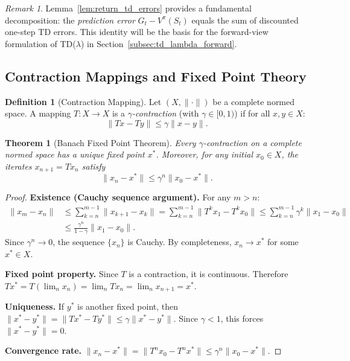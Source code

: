 \documentclass[11pt,a4paper]{article}
\theoremstyle{definition}
\newtheorem{definition}{Definition}[section]
\theoremstyle{plain}
\newtheorem{theorem}{Theorem}[section]
\theoremstyle{remark}
\newtheorem{remark}{Remark}[section]
\begin{document}
\begin{remark}
Lemma~\ref{lem:return_td_errors} provides a fundamental decomposition: the \emph{prediction error} $G_t - V^\pi(S_t)$ equals the sum of discounted one-step TD errors. This identity will be the basis for the forward-view formulation of TD($\lambda$) in Section~\ref{subsec:td_lambda_forward}.
\end{remark}

\subsection{Contraction Mappings and Fixed Point Theory}
\label{subsec:contraction}

\begin{definition}[Contraction Mapping]
\label{def:contraction}
Let $(X, \|\cdot\|)$ be a complete normed space. A mapping $T: X \to X$ is a \emph{$\gamma$-contraction} (with $\gamma \in [0,1)$) if for all $x, y \in X$:
\begin{equation}
    \|Tx - Ty\| \leq \gamma \|x - y\|.
    \label{eq:contraction}
\end{equation}
\end{definition}

\begin{theorem}[Banach Fixed Point Theorem]
\label{thm:banach}
Every $\gamma$-contraction on a complete normed space has a unique fixed point $x^*$. Moreover, for any initial $x_0 \in X$, the iterates $x_{n+1} = Tx_n$ satisfy
\begin{equation}
    \|x_n - x^*\| \leq \gamma^n \|x_0 - x^*\|.
    \label{eq:banach_rate}
\end{equation}
\end{theorem}

\begin{proof}
\textbf{Existence (Cauchy sequence argument).} For any $m > n$:
\begin{align}
    \|x_m - x_n\| &\leq \sum_{k=n}^{m-1} \|x_{k+1} - x_k\|
    = \sum_{k=n}^{m-1} \|T^k x_1 - T^k x_0\|
    \leq \sum_{k=n}^{m-1} \gamma^k \|x_1 - x_0\| \nonumber\\
    &\leq \frac{\gamma^n}{1-\gamma} \|x_1 - x_0\|. \label{eq:banach_cauchy}
\end{align}
Since $\gamma^n \to 0$, the sequence $\{x_n\}$ is Cauchy. By completeness, $x_n \to x^*$ for some $x^* \in X$.

\textbf{Fixed point property.} Since $T$ is a contraction, it is continuous. Therefore $Tx^* = T(\lim_n x_n) = \lim_n Tx_n = \lim_n x_{n+1} = x^*$.

\textbf{Uniqueness.} If $y^*$ is another fixed point, then $\|x^* - y^*\| = \|Tx^* - Ty^*\| \leq \gamma \|x^* - y^*\|$. Since $\gamma < 1$, this forces $\|x^* - y^*\| = 0$.

\textbf{Convergence rate.} $\|x_n - x^*\| = \|T^n x_0 - T^n x^*\| \leq \gamma^n \|x_0 - x^*\|$.
\end{proof}
\end{document}
